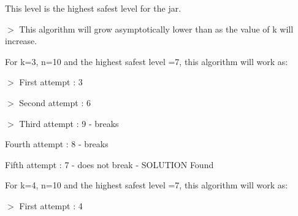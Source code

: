 \documentclass[letterpaper,portrait,12pt]{article}
\begin{document}
\begin{flushleft}
This level is the highest safest level for the jar.
\end{flushleft}


\begin{flushleft}

\end{flushleft}


\begin{flushleft}
$>$ This algorithm will grow asymptotically lower than as the value of k will increase.
\end{flushleft}


\begin{flushleft}

\end{flushleft}


\begin{flushleft}
For k=3, n=10 and the highest safest level =7, this algorithm will work as:
\end{flushleft}


\begin{flushleft}
 $>$ First attempt : 3
\end{flushleft}


\begin{flushleft}
 $>$ Second attempt : 6
\end{flushleft}


\begin{flushleft}
 $>$ Third attempt : 9 - breaks
\end{flushleft}


\begin{flushleft}
	Fourth attempt : 8 - breaks
\end{flushleft}


\begin{flushleft}
	Fifth attempt : 7 - does not break - SOLUTION Found
\end{flushleft}


\begin{flushleft}

\end{flushleft}


\begin{flushleft}
For k=4, n=10 and the highest safest level =7, this algorithm will work as:
\end{flushleft}


\begin{flushleft}
 $>$ First attempt : 4
\end{flushleft}
\end{document}
